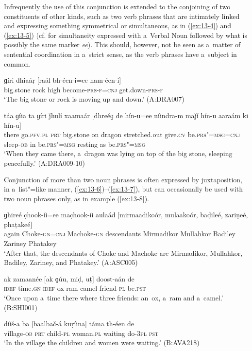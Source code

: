 Infrequently the use of this conjunction is extended to the conjoining of two constituents of other kinds, such as two verb phrases that are intimately linked and expressing something symmetrical or simultaneous, as in (\ref{ex:13-4}) and (\ref{ex:13-5}) (cf.  for simultaneity expressed with a~Verbal Noun followed by what is possibly the same marker \textit{ee}). This should, however, not be seen as a~matter of sentential coordination in a~strict sense, as the verb phrases have a~subject in common.

\begin{exe}
\ex
\label{ex:13-4}
\gll ɡíri dhiaáṛ [raál bh-éen-i=ee nam-éen-i]  \\
big.stone rock high become-\textsc{prs-f=cnj} get.down-\textsc{prs-f}  \\
\glt `The big stone or rock is moving up and down.' (A:DRA007)

\ex
\label{ex:13-5}
\gll táa ɡíia ta ɡíri ǰhulí xaamaár [dhreéɡ de hín-u=ee níindra-m maǰí hín-u aaraám ki hín-u] \\
there go.\textsc{pfv.pl} \textsc{prt} big.stone on dragon stretched.out  give.\textsc{cv} be.\textsc{prs"=msg=cnj} sleep-\textsc{ob} in be.\textsc{prs"=msg}  resting as be.\textsc{prs"=msg}  \\
\glt `When they came there, a~dragon was lying on top of the big stone, sleeping peacefully.' (A:DRA009-10) 
\end{exe}

 Conjunction of more than two noun phrases is often expressed by juxtaposition, in a~list"=like manner, (\ref{ex:13-6})--(\ref{ex:13-7}), but can occasionally be used with two noun phrases only, as in example (\ref{ex:13-8}).

\begin{exe}
\ex
\label{ex:13-6}
\gll ɡhireé c̣hook-íi=ee mac̣hook-íi aulaád [mirmaadikoór, mulaakoór, baḍileé, zariṇeé, phaṭakeé] \\
again Choke-\textsc{gn=cnj} Machoke-\textsc{gn} descendants  Mirmadikor Mullahkor Badiley Zariney Phatakey \\
\glt `After that, the descendants of Choke and Machoke are Mirmadikor, Mullahkor, Badiley, Zariney, and Phatakey.' (A:ASC005)

\ex
\label{ex:13-7}
\gll ak zamaanée [ak ɡúu, miḍ, uṭ] doost-aán de \\
\textsc{idef} time.\textsc{gn} \textsc{ idef} ox ram camel friend-\textsc{pl}  be.\textsc{pst}  \\
\glt `Once upon a~time there where three friends: an~ox, a~ram and a~camel.' (B:SHI001)

\ex
\label{ex:13-8}
\gll díiš-a ba [baalbač-á kuṛíina] táma th-éen de \\
village-\textsc{ob} \textsc{prt} child-\textsc{pl} woman.\textsc{pl} waiting do-\textsc{3pl} \textsc{pst}  \\
\glt `In the village the children and women were waiting.' (B:AVA218) 
\end{exe}

